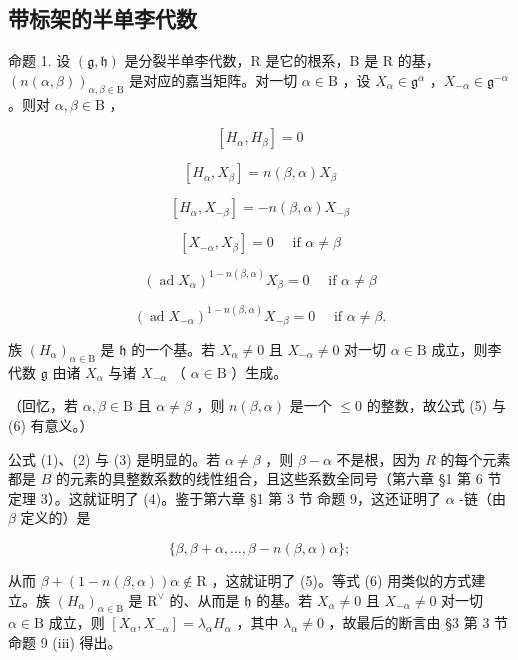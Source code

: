 \subsection{带标架的半单李代数}

命题 1. 设 \((\mathfrak{g},\mathfrak{h})\) 是分裂半单李代数，R 是它的根系，B 是 R 的基，\((n(\alpha ,\beta))_{\alpha ,\beta \in \mathrm{B}}\) 是对应的嘉当矩阵。对一切 \(\alpha \in \mathrm{B}\) ，设 \(X_{\alpha}\in \mathfrak{g}^{\alpha}\) ，\(X_{-\alpha}\in \mathfrak{g}^{-\alpha}\) 。则对 \(\alpha ,\beta \in \mathrm{B}\) ，

\[
[ H _ {\alpha}, H _ {\beta} ] = 0\tag{1}
\]

\[
[ H _ {\alpha}, X _ {\beta} ] = n (\beta , \alpha) X _ {\beta}\tag{2}
\]

\[
[ H _ {\alpha}, X _ {- \beta} ] = - n (\beta , \alpha) X _ {- \beta}\tag{3}
\]

\[
[ X _ {- \alpha}, X _ {\beta} ] = 0 \quad \text { if } \alpha \neq \beta\tag{4}
\]

\[
(\operatorname{ad} X _ {\alpha}) ^ {1 - n (\beta , \alpha)} X _ {\beta} = 0 \quad \text { if } \alpha \neq \beta\tag{5}
\]

\[
(\operatorname{ad} X _ {- \alpha}) ^ {1 - n (\beta , \alpha)} X _ {- \beta} = 0 \quad \text { if } \alpha \neq \beta .\tag{6}
\]

族 \((H_{\alpha})_{\alpha \in \mathrm{B}}\) 是 \(\mathfrak{h}\) 的一个基。若 \(X_{\alpha} \neq 0\) 且 \(X_{-\alpha} \neq 0\) 对一切 \(\alpha \in \mathrm{B}\) 成立，则李代数 \(\mathfrak{g}\) 由诸 \(X_{\alpha}\) 与诸 \(X_{-\alpha}\) （ \(\alpha \in \mathrm{B}\) ）生成。

（回忆，若 \(\alpha, \beta \in \mathrm{B}\) 且 \(\alpha \neq \beta\) ，则 \(n(\beta, \alpha)\) 是一个 \(\leq 0\) 的整数，故公式 (5) 与 (6) 有意义。）

公式 (1)、(2) 与 (3) 是明显的。若 \(\alpha \neq \beta\) ，则 \(\beta - \alpha\) 不是根，因为 \(R\) 的每个元素都是 \(B\) 的元素的具整数系数的线性组合，且这些系数全同号（第六章 §1 第 6 节 定理 3）。这就证明了 (4)。鉴于第六章 §1 第 3 节 命题 9，这还证明了 \(\alpha\) -链（由 \(\beta\) 定义的）是

\[
\{\beta , \beta + \alpha , \dots , \beta - n (\beta , \alpha) \alpha \};
\]

从而 \(\beta + (1 - n(\beta, \alpha))\alpha \notin \mathrm{R}\) ，这就证明了 (5)。等式 (6) 用类似的方式建立。族 \((H_{\alpha})_{\alpha \in \mathrm{B}}\) 是 \(\mathrm{R}^{\vee}\) 的、从而是 \(\mathfrak{h}\) 的基。若 \(X_{\alpha} \neq 0\) 且 \(X_{-\alpha} \neq 0\) 对一切 \(\alpha \in \mathrm{B}\) 成立，则 \([X_{\alpha}, X_{-\alpha}] = \lambda_{\alpha}H_{\alpha}\) ，其中 \(\lambda_{\alpha} \neq 0\) ，故最后的断言由 §3 第 3 节 命题 9 (iii) 得出。

